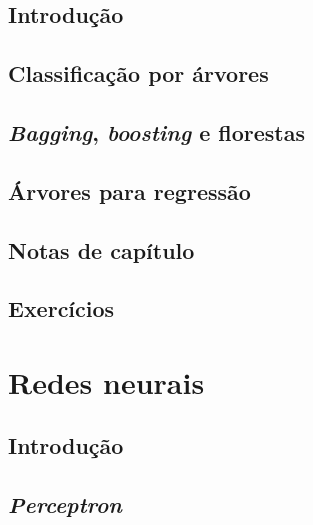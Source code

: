 \documentclass[
]{latex/krantz}
\theoremstyle{definition}
\theoremstyle{definition}
\theoremstyle{definition}
\theoremstyle{definition}
\theoremstyle{remark}
\begin{document}
\hypertarget{introduuxe7uxe3o-9}{%
\section{Introdução}\label{introduuxe7uxe3o-9}}

\hypertarget{classificauxe7uxe3o-por-uxe1rvores}{%
\section{Classificação por árvores}\label{classificauxe7uxe3o-por-uxe1rvores}}

\hypertarget{bagging-boosting-e-florestas}{%
\section{\texorpdfstring{\emph{Bagging}, \emph{boosting} e florestas}{Bagging, boosting e florestas}}\label{bagging-boosting-e-florestas}}

\hypertarget{uxe1rvores-para-regressuxe3o}{%
\section{Árvores para regressão}\label{uxe1rvores-para-regressuxe3o}}

\hypertarget{notas-de-capuxedtulo-9}{%
\section{Notas de capítulo}\label{notas-de-capuxedtulo-9}}

\hypertarget{exercuxedcios-9}{%
\section{Exercícios}\label{exercuxedcios-9}}

\hypertarget{redes-neurais}{%
\chapter{Redes neurais}\label{redes-neurais}}

\hypertarget{introduuxe7uxe3o-10}{%
\section{Introdução}\label{introduuxe7uxe3o-10}}

\hypertarget{perceptron}{%
\section{\texorpdfstring{\emph{Perceptron}}{Perceptron}}\label{perceptron}}
\end{document}
